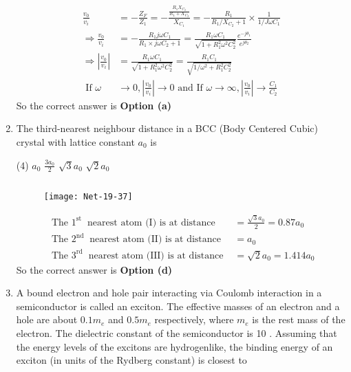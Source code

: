 \begin{enumerate}
\begin{answer}
	\begin{align*}
	\frac{v_{0}}{v_{i}}&=-\frac{Z_{F}}{Z_{1}}=-\frac{\frac{R_{1} X_{C_{2}}}{R_{1}+X_{C_{2}}}}{X_{C_{1}}}=-\frac{R_{1}}{R_{1} / X_{C_{2}}+1} \times \frac{1}{1 / J \omega C_{1}}\\
	\Rightarrow \frac{v_{0}}{v_{i}}&=-\frac{R_{1} j \omega C_{1}}{R_{1} \times j \omega C_{2}+1}=\frac{R_{1} \omega C_{1}}{\sqrt{1+R_{1}^{2} \omega^{2} C_{2}^{2}}} \frac{e^{-j \theta_{1}}}{e^{j \theta_{2}}} \\
	\Rightarrow\left|\frac{v_{0}}{v_{i}}\right|&=\frac{R_{1} \omega C_{1}}{\sqrt{1+R_{1}^{2} \omega^{2} C_{2}^{2}}}=\frac{R_{1} C_{1}}{\sqrt{1 / \omega^{2}+R_{1}^{2} C_{2}^{2}}}\\
\text{	If }\omega &\rightarrow 0,\left|\frac{v_{0}}{v_{i}}\right| \rightarrow 0
\text{	and If }\omega \rightarrow \infty,\left|\frac{v_{0}}{v_{i}}\right| \rightarrow \frac{C_{1}}{C_{2}}
	\end{align*}
		So the correct answer is \textbf{Option (a)}
\end{answer}
\item The third-nearest neighbour distance in a BCC (Body Centered Cubic) crystal with lattice constant $a_{0}$ is
 \begin{tasks}(4)
	\task[\textbf{a.}] $a_{0}$
	\task[\textbf{b.}]$\frac{3 a_{0}}{2}$
	\task[\textbf{c.}] $\sqrt{3} a_{0}$
	\task[\textbf{d.}]  $\sqrt{2} a_{0}$
\end{tasks}
\begin{answer}$\left. \right. $\\
	\begin{figure}[H]
		\centering
		\texttt{[image: Net-19-37]}
	\end{figure}
	\begin{align*}
	\text { The } 1^{\text {st }} \text { nearest atom (I) is at distance }&=\frac{\sqrt{3} a_{0}}{2}=0.87 a_{0}\\
	\text { The } 2^{\text {nd }} \text { nearest atom (II) is at distance }&=a_{0}\\
	\text { The } 3^{\text {rd }} \text { nearest atom (III) is at distance }&=\sqrt{2} a_{0}=1.414 a_{0}
	\end{align*}
		So the correct answer is \textbf{Option (d)}
\end{answer}
\item A bound electron and hole pair interacting via Coulomb interaction in a semiconductor is called an exciton. The effective masses of an electron and a hole are about $0.1 m_{e}$ and $0.5 m_{e}$ respectively, where $m_{e}$ is the rest mass of the electron. The dielectric constant of the semiconductor is 10 . Assuming that the energy levels of the excitons are hydrogenlike, the binding energy of an exciton (in units of the Rydberg constant) is closest to

\end{enumerate}
